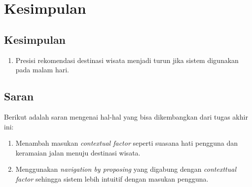 \chapter{Kesimpulan}
\section{Kesimpulan}
\begin{enumerate}
	\item Presisi rekomendasi destinasi wisata menjadi turun jika sistem digunakan pada malam hari. 
	
\end{enumerate}
\section{Saran}
\par
Berikut adalah saran mengenai hal-hal yang bisa dikembangkan dari tugas akhir ini:
\begin{enumerate}
	\item Menambah masukan \textit{contextual factor} seperti suasana hati pengguna dan keramaian jalan menuju destinasi wisata.
	\item Menggunakan \textit{navigation by proposing} yang digabung dengan \textit{contexttual factor} sehingga sistem lebih intuitif
	dengan masukan pengguna.
\end{enumerate}
